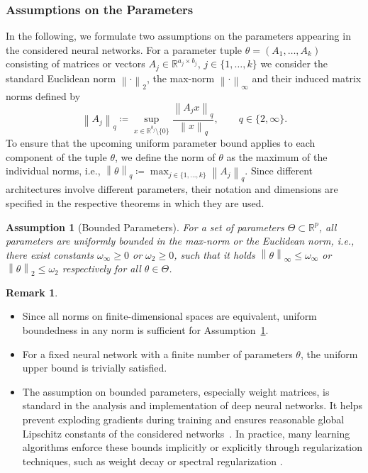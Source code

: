 \documentclass[10pt]{article}
\newtheorem{assumpB}{Assumption}
\theoremstyle{definition}
\newtheorem{remark}[theorem]{Remark}
\numberwithin{equation}{section}
\newcommand\norm[1]{\left\lVert#1\right\rVert}
\newcommand{\R}{\mathbb{R}}
\begin{document}
\subsubsection*{Assumptions on the Parameters}

In the following, we formulate two assumptions on the parameters appearing in the considered neural networks. For a parameter tuple $\theta = (A_1, \dots, A_k)$ consisting of matrices or vectors $A_j \in \R^{a_j \times b_j}$, $j\in \{1,\ldots,k\}$ we consider the standard Euclidean norm $\norm{\cdot}_2$, the max-norm $\norm{\cdot}_\infty$ and their induced matrix norms defined by
\begin{equation*}
    \norm{A_j}_q \coloneqq \sup_{x \in \R^{b_j} \setminus \{0\}} \frac{\norm{A_jx}_q}{\norm{x}_q}, \qquad q \in \{2,\infty\}.
\end{equation*}
To ensure that the upcoming uniform parameter bound applies to each component of the tuple $\theta$, we define the norm of $\theta$ as the maximum of the individual norms, i.e., $\norm{\theta}_q \coloneqq \max_{j \in \{1,\dots,k\}} \norm{A_j}_q$. Since different architectures involve different parameters, their notation and dimensions are specified in the respective theorems in which they are used. 

\begin{assumpB}[Bounded Parameters]
	\label{ass:B_weights_bounded}
	For a set of parameters $\Theta \subset \R^p$, all parameters are uniformly bounded in the max-norm or the Euclidean norm, i.e., there exist constants $\omega_\infty\geq 0$ or $\omega_2\geq 0$, such that it holds $\norm{\theta}_\infty \leq \omega_\infty$ or $\norm{\theta}_2 \leq \omega_2$ respectively for all $\theta \in \Theta$.
\end{assumpB}

\begin{remark}~
\begin{itemize}
\item	Since all norms on finite-dimensional spaces are equivalent, uniform boundedness in any norm is sufficient for Assumption~\ref{ass:B_weights_bounded}.
\item  For a fixed neural network with a finite number of parameters $\theta$, the uniform upper bound is trivially satisfied.
	
\item The assumption on bounded parameters, especially weight matrices, is standard in the analysis and implementation of deep neural networks. It helps prevent exploding gradients during training and ensures reasonable global Lipschitz constants of the considered networks~\cite{miyato_spectral_2018,salimans_weight_2016,schoenlieb2025}. In practice, many learning algorithms enforce these bounds implicitly or explicitly through regularization techniques, such as weight decay \cite{Goodfellowbook2016} or spectral regularization \cite{yoshida2017spectral}. 
\end{itemize}
\end{remark}
\end{document}
